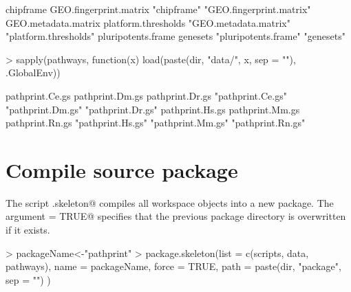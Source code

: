 \documentclass{article}
\renewenvironment{Schunk}{\vspace{\topsep}}{\vspace{\topsep}}
\begin{document}
\begin{Schunk}
\begin{Soutput}
               chipframe   GEO.fingerprint.matrix 
             "chipframe" "GEO.fingerprint.matrix" 
     GEO.metadata.matrix      platform.thresholds 
   "GEO.metadata.matrix"    "platform.thresholds" 
      pluripotents.frame                 genesets 
    "pluripotents.frame"               "genesets" 
\end{Soutput}
\begin{Sinput}
> sapply(pathways, function(x){
   load(paste(dir, "data/", x, sep = ""), .GlobalEnv)})
\end{Sinput}
\begin{Soutput}
  pathprint.Ce.gs   pathprint.Dm.gs   pathprint.Dr.gs 
"pathprint.Ce.gs" "pathprint.Dm.gs" "pathprint.Dr.gs" 
  pathprint.Hs.gs   pathprint.Mm.gs   pathprint.Rn.gs 
"pathprint.Hs.gs" "pathprint.Mm.gs" "pathprint.Rn.gs" 
\end{Soutput}
\end{Schunk}
\section{Compile source package}
The \verb@utils@ script \verb@package.skeleton@ compiles all workspace objects into a new package. The argument \verb@force = TRUE@ specifies that the previous package directory is overwritten if it exists.
\begin{Schunk}
\begin{Sinput}
> packageName<-"pathprint"
> package.skeleton(list = c(scripts, data, pathways),
                  name = packageName, force = TRUE,
                  path = paste(dir, "package", sep = "")
                  )
\end{Sinput}
\end{Schunk}
\end{document}
